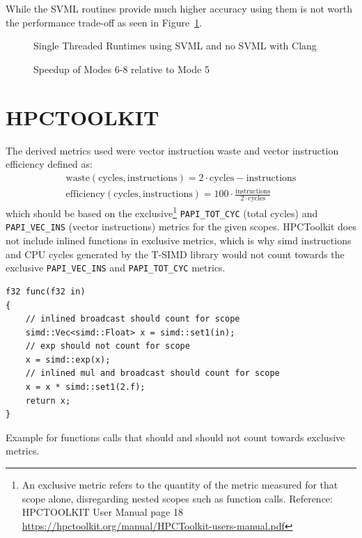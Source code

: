 \documentclass[a4paper, 11pt]{memoir}
\begin{document}
    While the SVML routines provide much higher accuracy using them is not worth the
    performance trade-off as seen in Figure~\ref{fig:runtimes_st_svml_v_no}.
    \begin{figure}[t]
        \centering
        
        \caption{Single Threaded Runtimes using SVML and no SVML with Clang}
        \label{fig:runtimes_st_svml_v_no}
    \end{figure}

    \begin{figure}[t]
        \centering
        
        \caption{Speedup of Modes 6-8 relative to Mode 5}
        \label{fig:runtimes_st_v_mt}
    \end{figure}

    \section{HPCTOOLKIT}
    \cite{hpc_toolkit}

    The derived metrics used were vector instruction waste and vector instruction efficiency defined as:
    \begin{align}
        \text{waste}(\text{cycles}, \text{instructions}) = 2 \cdot \text{cycles} - \text{instructions} \label{eq:vec_waste}\\
        \text{efficiency}(\text{cycles}, \text{instructions}) = 100 \cdot \frac{\text{instructions}}{2\cdot\text{cycles}} \label{eq:vec_efficiency}
    \end{align}
    which should be based on the exclusive\footnote{An exclusive metric refers to the quantity of the metric measured for that scope
    alone, disregarding nested scopes such as function calls. Reference: HPCTOOLKIT User Manual page 18
    \href{https://hpctoolkit.org/manual/HPCToolkit-users-manual.pdf}{https://hpctoolkit.org/manual/HPCToolkit-users-manual.pdf}}
    \texttt{PAPI_TOT_CYC} (total cycles) and \texttt{PAPI_VEC_INS}
    (vector instructions) metrics for the given scopes. HPCToolkit does not include inlined functions in exclusive metrics, which is why \gls{simd}
    instructions and CPU cycles generated by the T-SIMD library would not count towards the exclusive \texttt{PAPI_VEC_INS} and \texttt{PAPI_TOT_CYC}
    metrics.

    \begin{listing}[H]
        \begin{verbatim}
f32 func(f32 in)
{
    // inlined broadcast should count for scope
    simd::Vec<simd::Float> x = simd::set1(in);
    // exp should not count for scope
    x = simd::exp(x);
    // inlined mul and broadcast should count for scope
    x = x * simd::set1(2.f);
    return x;
}
        \end{verbatim}
        \caption{Example for functions calls that should and should not count towards exclusive metrics.}
        \label{lst:scopes_example}
    \end{listing}
\end{document}
